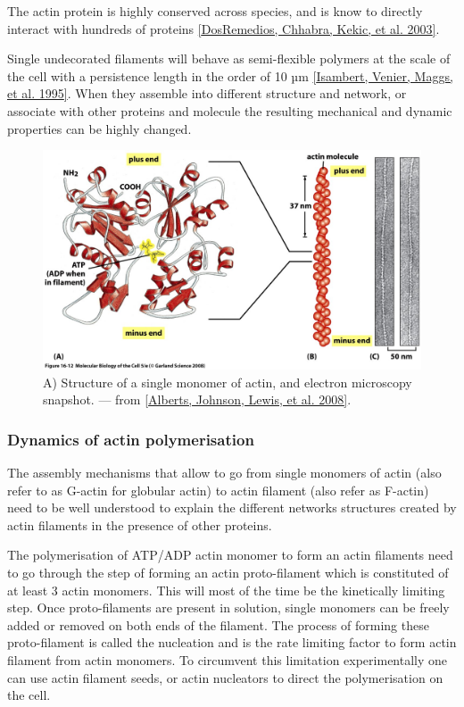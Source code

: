 \documentclass[A4paperpaper,11pt,english]{sphinxmanual}
\begin{document}
The actin protein is highly conserved across species, and is know to directly
interact with hundreds of proteins {\hyperref[parts/part1:dosremedios2003]{{[}DosRemedios, Chhabra, Kekic,  et al.  2003{]}}}.

Single undecorated filaments will behave  as
semi-flexible polymers at the scale of the cell with a persistence length in the order of 10 µm {\hyperref[parts/part1:isambert1995]{{[}Isambert, Venier, Maggs,  et al.  1995{]}}}. When they
assemble into different structure and network, or associate with other proteins
and molecule the resulting mechanical and dynamic properties can be highly changed.
\begin{figure}[htbp]
\centering
\capstart

\includegraphics[width=0.700\linewidth]{actin-structure.jpg}
\caption{A) Structure of a single monomer of actin, and electron microscopy snapshot.
— from {\hyperref[parts/part1:alberts2008]{{[}Alberts, Johnson, Lewis,  et al.  2008{]}}}.}\label{parts/part1:fig-actin}\end{figure}


\subsubsection{Dynamics of actin polymerisation}
\label{parts/part1:dynamics-of-actin-polymerisation}
The assembly mechanisms that allow to go from single monomers of actin (also
refer to as G-actin for globular actin) to actin filament (also refer as
F-actin) need to be well understood to explain the different networks
structures created by actin filaments in the presence of other proteins.

The polymerisation of ATP/ADP actin monomer to form an actin filaments need to
go through the step of forming an actin proto-filament which is constituted of
at least 3 actin monomers. This will most of the time be the kinetically
limiting step. Once proto-filaments are present in solution, single monomers
can be freely added or removed on both ends of the filament.  The process of
forming these proto-filament is called the nucleation and is the rate limiting
factor to form actin filament from actin monomers. To circumvent this
limitation experimentally one can use actin filament seeds, or actin nucleators
to direct the polymerisation on the cell.
\end{document}
